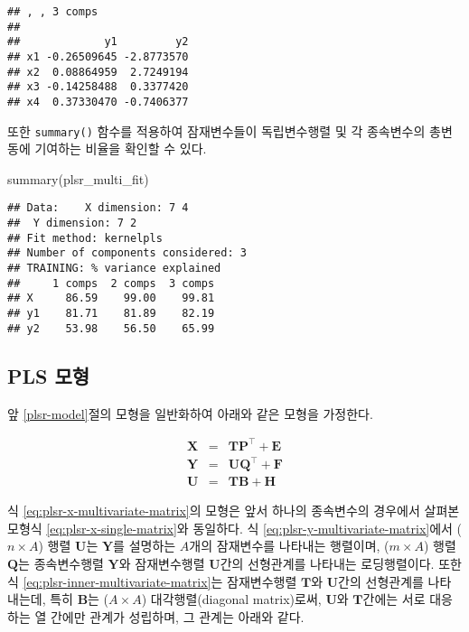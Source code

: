 \documentclass[
]{book}
\newenvironment{Shaded}{\begin{snugshade}}{\end{snugshade}}
\newcommand{\FunctionTok}[1]{\textcolor[rgb]{0.00,0.00,0.00}{#1}}
\newcommand{\NormalTok}[1]{#1}
\begin{document}
\begin{verbatim}
## , , 3 comps
## 
##             y1         y2
## x1 -0.26509645 -2.8773570
## x2  0.08864959  2.7249194
## x3 -0.14258488  0.3377420
## x4  0.37330470 -0.7406377
\end{verbatim}

또한 \texttt{summary()} 함수를 적용하여 잠재변수들이 독립변수행렬 및 각 종속변수의 총변동에 기여하는 비율을 확인할 수 있다.

\begin{Shaded}
\begin{Highlighting}[]
\FunctionTok{summary}\NormalTok{(plsr\_multi\_fit)}
\end{Highlighting}
\end{Shaded}

\begin{verbatim}
## Data:    X dimension: 7 4 
##  Y dimension: 7 2
## Fit method: kernelpls
## Number of components considered: 3
## TRAINING: % variance explained
##     1 comps  2 comps  3 comps
## X     86.59    99.00    99.81
## y1    81.71    81.89    82.19
## y2    53.98    56.50    65.99
\end{verbatim}

\hypertarget{plsr-multivariate-model}{%
\subsection{PLS 모형}\label{plsr-multivariate-model}}

앞 \ref{plsr-model}절의 모형을 일반화하여 아래와 같은 모형을 가정한다.

\begin{eqnarray}
\mathbf{X} &=& \mathbf{T} \mathbf{P}^\top + \mathbf{E} \label{eq:plsr-x-multivariate-matrix}\\
\mathbf{Y} &=& \mathbf{U} \mathbf{Q}^\top + \mathbf{F} \label{eq:plsr-y-multivariate-matrix}\\
\mathbf{U} &=& \mathbf{T} \mathbf{B} + \mathbf{H}  \label{eq:plsr-inner-multivariate-matrix}
\end{eqnarray}

식 \eqref{eq:plsr-x-multivariate-matrix}의 모형은 앞서 하나의 종속변수의 경우에서 살펴본 모형식 \eqref{eq:plsr-x-single-matrix}와 동일하다. 식 \eqref{eq:plsr-y-multivariate-matrix}에서 (\(n \times A\)) 행렬 \(\mathbf{U}\)는 \(\mathbf{Y}\)를 설명하는 \(A\)개의 잠재변수를 나타내는 행렬이며, (\(m \times A\)) 행렬 \(\mathbf{Q}\)는 종속변수행렬 \(\mathbf{Y}\)와 잠재변수행렬 \(\mathbf{U}\)간의 선형관계를 나타내는 로딩행렬이다. 또한 식 \eqref{eq:plsr-inner-multivariate-matrix}는 잠재변수행렬 \(\mathbf{T}\)와 \(\mathbf{U}\)간의 선형관계를 나타내는데, 특히 \(\mathbf{B}\)는 (\(A \times A\)) 대각행렬(diagonal matrix)로써, \(\mathbf{U}\)와 \(\mathbf{T}\)간에는 서로 대응하는 열 간에만 관계가 성립하며, 그 관계는 아래와 같다.
\end{document}

